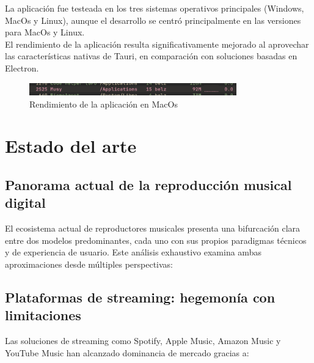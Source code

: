 \documentclass[11pt, a4paper]{article}
\begin{document}
        La aplicación fue testeada en los tres sistemas operativos principales (Windows, MacOs y Linux), aunque el desarrollo se centró principalmente en las versiones para MacOs y Linux. \\

        El rendimiento de la aplicación resulta significativamente mejorado al aprovechar las características nativas de Tauri, en comparación con soluciones basadas en Electron. \\

        \begin{figure}[h!]
            \centering
            \includegraphics[width=0.8\textwidth]{media/imagemusyram.png}
            \caption{Rendimiento de la aplicación en MacOs}
            \label{fig:ejemplo}
        \end{figure}

\section{Estado del arte}

\subsection{Panorama actual de la reproducción musical digital}

El ecosistema actual de reproductores musicales presenta una bifurcación clara entre dos modelos predominantes, cada uno con sus propios paradigmas técnicos y de experiencia de usuario. Este análisis exhaustivo examina ambas aproximaciones desde múltiples perspectivas:

\subsection{Plataformas de streaming: hegemonía con limitaciones}

Las soluciones de streaming como Spotify, Apple Music, Amazon Music y YouTube Music han alcanzado dominancia de mercado gracias a:
\end{document}
